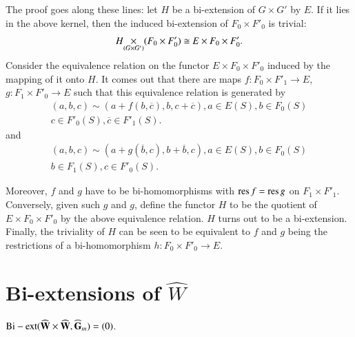 The proof goes along these lines: let $H$ be a bi-extension of $G\times G'$ by $E$. If it lies in the above kernel, then the induced bi-extension of $F_{0}\times F'_{0}$ is trivial:
$$
\fprod{H}{(F_{0}\times F'_{0})}{(G\times G')}\cong E\times F_{0}\times F'_{0}.
$$
Consider the equivalence relation on the functor $E\times F_{0}\times F'_{0}$ induced by the mapping of it onto $H$. It comes out that there are maps $f:F_{0}\times F'_{1}\to E$, $g:F_{1}\times F'_{0}\to E$ such that this equivalence relation is generated by
\begin{multline}
(a,b,c)\sim (a+f(b,\overline{c}),b,c+\overline{c}),a\in E(S),b\in F_{0}(S)\\
c\in F'_{0}(S),\overline{c}\in F'_{1}(S).\label{art15-eq1}
\end{multline}
and
\begin{multline}
(a,b,c)\sim (a+g(\overline{b},c),b+\overline{b},c), a\in E(S), b\in F_{0}(S)\\
b\in F_{1}(S), c\in F'_{0}(S).\label{art15-eq2}
\end{multline}

Moreover, $f$ and $g$ have to be bi-homomorphisms with $\operatorname{\mathrm{res}} f=\operatorname{\mathrm{res}} g$ on $F_{1}\times F'_{1}$. Conversely, given such $g$ and $g$, define the functor $H$ to be the quotient of $E\times F_{0}\times F'_{0}$ by the above equivalence relation. $H$ turns out to be a bi-extension. Finally, the triviality of $H$ can be seen to be equivalent to $f$ and $g$ being the restrictions of a bi-homomorphism $h:F_{0}\times F'_{0}\to E$.

\section{Bi-extensions of \texorpdfstring{$\widehat{W}$}{W}}\label{art15-sec4}

\begin{proposition}\label{art15-prop2}
${\rm Bi-ext } (\widehat{\mathbf{W}}\times \widehat{\mathbf{W}},\widehat{\mathbf{G}}_{m})=(0)$.
\end{proposition}

